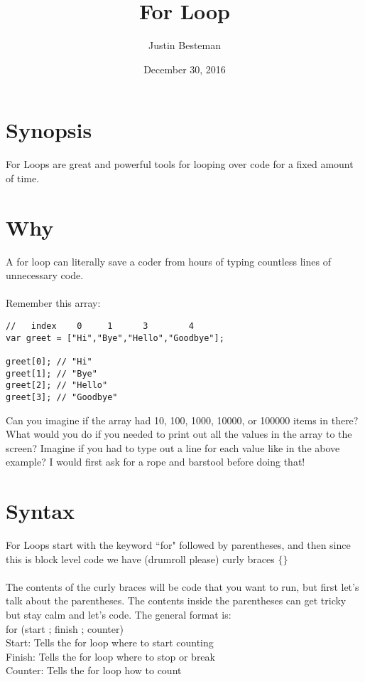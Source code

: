 \documentclass[12pt, letterpaper]{article}
\title{For Loop }
\author{Justin Besteman}
\date{December 30, 2016}
\begin{document}
\maketitle


\section*{Synopsis}

For Loops are great and powerful tools for looping over code for a fixed amount of time.\\

\section*{Why}

A for loop can literally save a coder from hours of typing countless lines of unnecessary code. \\ \\
Remember this array:

\begin{lstlisting}
//   index    0     1      3        4
var greet = ["Hi","Bye","Hello","Goodbye"];

greet[0]; // "Hi"
greet[1]; // "Bye"
greet[2]; // "Hello"
greet[3]; // "Goodbye"
\end{lstlisting}
Can you imagine if the array had 10, 100, 1000, 10000, or 100000 items in there? What would you do if you needed to print out all the values in the array to the screen? Imagine if you had to type out a line for each value like in the above example? I would first ask for a rope and barstool before doing that!\\
\section*{Syntax}

For Loops start with the keyword ``for" followed by parentheses, and then since this is block level code we have (drumroll please) curly braces $\lbrace\rbrace$ \\ \\
The contents of the curly braces will be code that you want to run, but first let's talk about the parentheses. The contents inside the parentheses can get tricky but stay calm and let's code. The general format is: \\
for (start ; finish ; counter) \\
Start: Tells the for loop where to start counting\\
Finish: Tells the for loop where to stop or break\\
Counter: Tells the for loop how to count\\ \\
\end{document}
